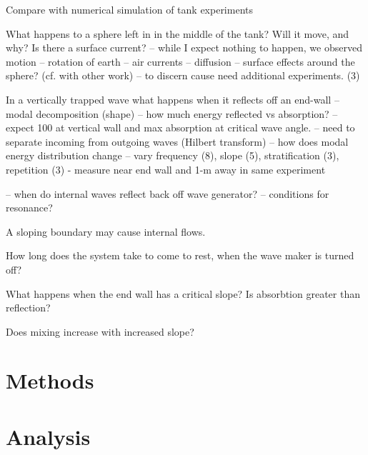\documentclass[11pt,letterpaper]{article}
\begin{document}
	Compare with numerical simulation of tank experiments
	
	 What happens to a sphere left in in the middle of the tank? 
	     Will it move, and  why? Is there a surface current?
	     -- while I expect nothing to happen,  we observed motion
	         -- rotation of earth
	         -- air currents
	         -- diffusion
	         -- surface effects around the sphere? (cf. with other work)
	   -- to discern cause need additional experiments. (3)
	  
	In a vertically trapped wave what happens when it reflects off an end-wall
	  -- modal decomposition (shape)
	  -- how much energy reflected vs absorption?
	     -- expect 100 at vertical wall and max absorption at critical wave angle.
	  -- need to separate incoming from outgoing waves (Hilbert transform)
	     -- how does modal energy distribution change
	    -- vary frequency (8), slope (5), stratification (3),  repetition (3)
	   - measure near end wall and 1-m away in same experiment
	   
	      -- when do internal waves reflect back off wave generator?
	           -- conditions for resonance?
	     
     A sloping boundary may cause internal flows. 
	 
	 How long does the system take to come to rest, when the wave maker is turned off?
	 
	 What happens when the end wall has a critical slope? Is absorbtion greater than reflection?
	 
	 Does mixing increase with increased slope?  
	

	
	\section{Methods}
	\section{Analysis}
	
\end{document}
